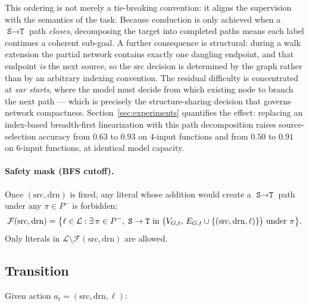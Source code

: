 \documentclass[11pt, a4paper]{article}
\theoremstyle{plain}
\theoremstyle{definition}
\theoremstyle{remark}
\newcommand{\SOURCE}{\texttt{S}}
\newcommand{\SINK}{\texttt{T}}
\newcommand{\Pminus}{P^{-}}
\newcommand{\VG}[1][]{V_{G\if\relax\detokenize{#1}\relax\else,#1\fi}}
\newcommand{\EG}[1][]{E_{G\if\relax\detokenize{#1}\relax\else,#1\fi}}
\begin{document}
This ordering is not merely a tie-breaking convention: it aligns the
supervision with the semantics of the task.  Because conduction is only
achieved when a $\SOURCE\!\to\!\SINK$ path \emph{closes}, decomposing the
target into completed paths means each label continues a coherent
sub-goal.  A further consequence is structural: during a walk extension
the partial network contains exactly one dangling endpoint, and that
endpoint \emph{is} the next source, so the $\mathrm{src}$ decision is
determined by the graph rather than by an arbitrary indexing convention.
The residual difficulty is concentrated at \emph{ear starts}, where the
model must decide from which existing node to branch the next path —
which is precisely the structure-sharing decision that governs network
compactness.  Section~\ref{sec:experiments} quantifies the effect: replacing
an index-based breadth-first linearization with this path decomposition
raises source-selection accuracy from $0.63$ to $0.93$ on $4$-input
functions and from $0.50$ to $0.91$ on $6$-input functions, at identical
model capacity.

\paragraph{Safety mask (BFS cutoff).}
Once $(\mathrm{src}, \mathrm{drn})$ is fixed, any literal whose
addition would create a $\SOURCE \to \SINK$ path under any
$\pi \in \Pminus$ is forbidden:
\[
  \mathcal{F}(\mathrm{src}, \mathrm{drn})
  = \bigl\{\ell \in \mathcal{L} :
      \exists\, \pi \in \Pminus,\;
      \SOURCE \to \SINK
      \text{ in } \bigl(\VG[t],\,\EG[t] \cup \{(\mathrm{src},\mathrm{drn},\ell)\}\bigr)
      \text{ under } \pi
    \bigr\}.
\]
Only literals in $\mathcal{L} \setminus \mathcal{F}(\mathrm{src},\mathrm{drn})$
are allowed.

\subsection{Transition}

Given action $a_t = (\mathrm{src}, \mathrm{drn}, \ell)$:
\end{document}
